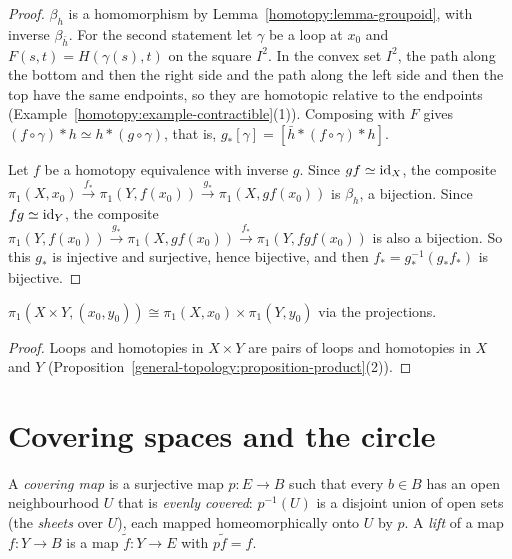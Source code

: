 \begin{proof}
$\beta_h$ is a homomorphism by Lemma~\ref{homotopy:lemma-groupoid}, with inverse $\beta_{\bar h}$. For the second statement let $\gamma$ be a loop at $x_0$ and
$F(s, t) = H(\gamma(s), t)$ on the square $I^2$. In the convex set $I^2$, the path along the bottom and then the right side and the path along the left side and
then the top have the same endpoints, so they are homotopic relative to the endpoints (Example~\ref{homotopy:example-contractible}(1)). Composing with
$F$ gives $(f \circ \gamma) * h \simeq h * (g \circ \gamma)$, that is, $g_*[\gamma] = [\bar h * (f \circ \gamma) * h]$.

Let $f$ be a homotopy equivalence with inverse $g$. Since $gf \simeq \mathrm{id}_X$, the composite
$\pi_1(X, x_0) \xrightarrow{f_*} \pi_1(Y, f(x_0)) \xrightarrow{g_*} \pi_1(X, gf(x_0))$ is $\beta_h$, a bijection. Since $fg \simeq \mathrm{id}_Y$, the composite
$\pi_1(Y, f(x_0)) \xrightarrow{g_*} \pi_1(X, gf(x_0)) \xrightarrow{f_*} \pi_1(Y, fgf(x_0))$ is also a bijection. So this $g_*$ is injective and surjective, hence
bijective, and then $f_* = g_*^{-1}(g_*f_*)$ is bijective.
\end{proof}

\begin{proposition}\label{homotopy:proposition-product}
$\pi_1(X \times Y, (x_0, y_0)) \cong \pi_1(X, x_0) \times \pi_1(Y, y_0)$ via the projections.
\end{proposition}

\begin{proof}
Loops and homotopies in $X \times Y$ are pairs of loops and homotopies in $X$ and $Y$ (Proposition~\ref{general-topology:proposition-product}(2)).
\end{proof}

\section{Covering spaces and the circle}\label{homotopy:section-coverings}

\begin{definition}\label{homotopy:definition-covering}
A \emph{covering map} is a surjective map $p \colon E \to B$ such that every $b \in B$ has an open neighbourhood $U$ that is \emph{evenly covered}: $p^{-1}(U)$ is a
disjoint union of open sets (the \emph{sheets} over $U$), each mapped homeomorphically onto $U$ by $p$. A \emph{lift} of a map $f \colon Y \to B$ is a map
$\tilde{f} \colon Y \to E$ with $p\tilde{f} = f$.
\end{definition}

